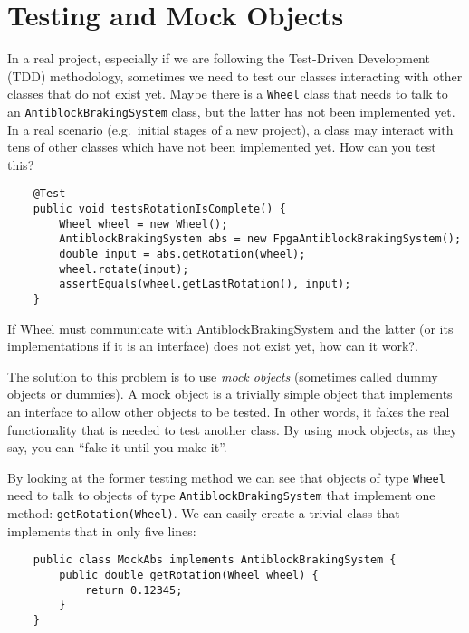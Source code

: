 
\section{Testing and Mock Objects}
\label{sec:testing-mock-objects}

In a real project, especially if we are following the Test-Driven
Development (TDD) methodology, sometimes we need to test our classes
interacting with other classes that do not exist yet. Maybe there is a
\verb+Wheel+ class that needs to talk to 
an \verb+AntiblockBrakingSystem+ class, but
the latter has not been implemented yet. In a real scenario
(e.g.~initial stages of a new project), a class may interact with tens
of other classes which have not been implemented yet. How can you test
this?


\begin{verbatim}
    @Test
    public void testsRotationIsComplete() {
        Wheel wheel = new Wheel();
        AntiblockBrakingSystem abs = new FpgaAntiblockBrakingSystem();
        double input = abs.getRotation(wheel);
        wheel.rotate(input);
        assertEquals(wheel.getLastRotation(), input);
    }
\end{verbatim}

If Wheel must communicate with AntiblockBrakingSystem and the latter
(or its implementations if it is an interface) does not exist yet, how can
it work?.

The solution to this problem 
is to use \emph{mock objects} (sometimes called dummy
objects or dummies). A mock object is a trivially simple object that
implements an interface to allow other objects to be tested. In other
words, it fakes the real functionality that is needed to test another
class. By using mock objects, as they say, you can 
``fake it until you make it''. 

By looking at the former testing method we can see that
objects of type \verb+Wheel+ need to talk to objects of type
\verb+AntiblockBrakingSystem+ that implement one method:
\verb+getRotation(Wheel)+. 
We can
easily create a trivial class that implements that in only five lines: 

\begin{verbatim}
    public class MockAbs implements AntiblockBrakingSystem {
        public double getRotation(Wheel wheel) {
            return 0.12345;
        }
    }
\end{verbatim}

